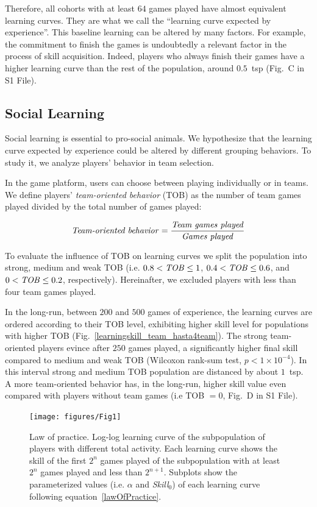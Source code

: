 \documentclass[a4paper,10pt]{book}
\theoremstyle{definition}
\begin{document}
Therefore, all cohorts with at least $64$ games played have almost equivalent learning curves.
They are what we call the ``learning curve expected by experience''.
This baseline learning can be altered by many factors. 
For example, the commitment to finish the games is undoubtedly a relevant factor in the process of skill acquisition.
Indeed, players who always finish their games have a higher learning curve than the rest of the population, around $0.5$~tsp (Fig.~C in S1 File).

\subsection{Social Learning}

Social learning is essential to pro-social animals.
We hypothesize that the learning curve expected by experience could be altered by different grouping behaviors. 
To study it, we analyze players' behavior in team selection.

In the game platform, users can choose between playing individually or in teams.
We define players' \emph{team-oriented behavior} (TOB) as the number of team games played divided by the total number of games played:

\begin{equation}
\text{\emph{Team-oriented behavior}} = \frac{\text{\emph{Team games played}}}{\text{\emph{Games played}}}
\end{equation}

To evaluate the influence of TOB on learning curves we split the population into strong, medium and weak TOB (i.e. $0.8<\text{\emph{TOB}}\leq 1$, $0.4 <\text{\emph{TOB}}\leq 0.6$, and $0 <\text{\emph{TOB}}\leq 0.2$, respectively). 
Hereinafter, we excluded players with less than four team games played.

In the long-run, between $200$ and $500$ games of experience, the learning curves are ordered according to their TOB level, exhibiting higher skill level for populations with higher TOB (Fig.~\ref{learningskill_team_hasta4team}).
The strong team-oriented players evince after $250$ games played, a significantly higher final skill compared to medium and weak TOB (Wilcoxon rank-sum test, $p<1 \times10^{-4}$).
In this interval strong and medium TOB population are distanced by about $1$~tsp.
A more team-oriented behavior has, in the long-run, higher skill value even compared with players without team games (i.e TOB $= 0$, Fig.~D in S1 File).

\begin{figure}[ht!]
\centering
\texttt{[image: figures/Fig1]}
\caption{Law of practice. Log-log learning curve of the subpopulation of players with different total activity. Each learning curve shows the skill of the first $2^n$ games played of the subpopulation with at least $2^n$ games played and less than $2^{n+1}$. Subplots show the parameterized values (i.e. $\alpha$ and \emph{Skill}$_0$) of each learning curve following equation~\ref{lawOfPractice}.}
\label{learningskill_curve}
\end{figure}
\end{document}
